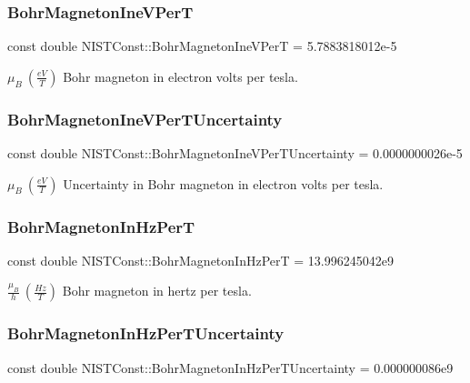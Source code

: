 \subsubsection{\texorpdfstring{Bohr\+Magneton\+Ine\+V\+PerT}{BohrMagnetonIneVPerT}}
{\footnotesize\ttfamily const double N\+I\+S\+T\+Const\+::\+Bohr\+Magneton\+Ine\+V\+PerT = 5.\+7883818012e-\/5}

$\mu_B \ (\frac{eV}{T})$ Bohr magneton in electron volts per tesla. \mbox{\label{group___bohr_magneton_gaaecd1151f7f9e12288a05ba80fb94bbd}} 
\subsubsection{\texorpdfstring{Bohr\+Magneton\+Ine\+V\+Per\+T\+Uncertainty}{BohrMagnetonIneVPerTUncertainty}}
{\footnotesize\ttfamily const double N\+I\+S\+T\+Const\+::\+Bohr\+Magneton\+Ine\+V\+Per\+T\+Uncertainty = 0.\+0000000026e-\/5}

$\mu_B \ (\frac{eV}{T})$ Uncertainty in Bohr magneton in electron volts per tesla. \mbox{\label{group___bohr_magneton_ga0c3cc268d0e1abc4703ea8f2c11ccab8}} 
\subsubsection{\texorpdfstring{Bohr\+Magneton\+In\+Hz\+PerT}{BohrMagnetonInHzPerT}}
{\footnotesize\ttfamily const double N\+I\+S\+T\+Const\+::\+Bohr\+Magneton\+In\+Hz\+PerT = 13.\+996245042e9}

$\frac{\mu_B}{h} \ (\frac{Hz}{T})$ Bohr magneton in hertz per tesla. \mbox{\label{group___bohr_magneton_ga6bbb08744c1f404415a645e006c75a0b}} 
\subsubsection{\texorpdfstring{Bohr\+Magneton\+In\+Hz\+Per\+T\+Uncertainty}{BohrMagnetonInHzPerTUncertainty}}
{\footnotesize\ttfamily const double N\+I\+S\+T\+Const\+::\+Bohr\+Magneton\+In\+Hz\+Per\+T\+Uncertainty = 0.\+000000086e9}

